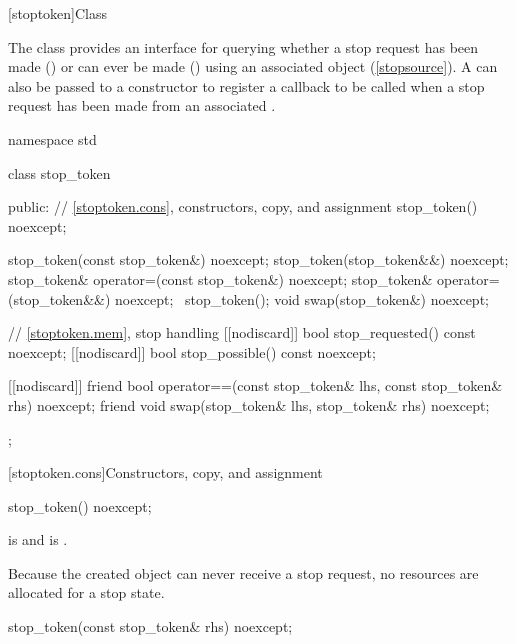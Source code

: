 %
[stoptoken]{Class }

\pnum
{}%
The class  provides an interface for querying whether
a stop request has been made ()
or can ever be made ()
using an associated  object (\ref{stopsource}).
A  can also be passed to a
 constructor
to register a callback to be called when a stop request has been made
from an associated .

\begin{codeblock}
namespace std {
  class stop_token {
  public:
    // \ref{stoptoken.cons}, constructors, copy, and assignment
    stop_token() noexcept;

    stop_token(const stop_token&) noexcept;
    stop_token(stop_token&&) noexcept;
    stop_token& operator=(const stop_token&) noexcept;
    stop_token& operator=(stop_token&&) noexcept;
    ~stop_token();
    void swap(stop_token&) noexcept;

    // \ref{stoptoken.mem}, stop handling
    [[nodiscard]] bool stop_requested() const noexcept;
    [[nodiscard]] bool stop_possible() const noexcept;

    [[nodiscard]] friend bool operator==(const stop_token& lhs, const stop_token& rhs) noexcept;
    friend void swap(stop_token& lhs, stop_token& rhs) noexcept;
  };
}
\end{codeblock}


[stoptoken.cons]{Constructors, copy, and assignment}

%
\begin{itemdecl}
stop_token() noexcept;
\end{itemdecl}

\begin{itemdescr}
\pnum
\ensures
{} is  and
 is .
\begin{note}
Because the created  object can never receive a stop request,
no resources are allocated for a stop state.
\end{note}
\end{itemdescr}

%
\begin{itemdecl}
stop_token(const stop_token& rhs) noexcept;
\end{itemdecl}

